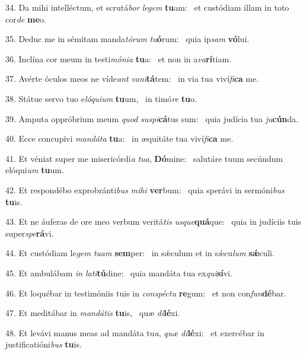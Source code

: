 34. Da mihi intelléctum, et scrutá\textit{bor} \textit{le}\textit{gem} \textbf{tu}am: \ast\  et custódiam illam in toto cor\textit{de} \textbf{me}o.\

35. Deduc me in sémitam manda\textit{tó}\textit{rum} \textit{tu}\textbf{ó}rum: \ast\  quia ip\textit{sam} \textbf{vó}lui.\

36. Inclína cor meum in testi\textit{mó}\textit{ni}\textit{a} \textbf{tu}a: \ast\  et non in a\textit{va}\textbf{rí}tiam.\

37. Avérte óculos meos ne víde\textit{ant} \textit{va}\textit{ni}\textbf{tá}tem: \ast\  in via tua viví\textit{fi}\textbf{ca} me.\

38. Státue servo tuo e\textit{ló}\textit{qui}\textit{um} \textbf{tu}um, \ast\  in timó\textit{re} \textbf{tu}o.\

39. Amputa oppróbrium meum \textit{quod} \textit{su}\textit{spi}\textbf{cá}tus sum: \ast\  quia judícia tua \textit{ju}\textbf{cún}da.\

40. Ecce concupívi \textit{man}\textit{dá}\textit{ta} \textbf{tu}a: \ast\  in æquitáte tua viví\textit{fi}\textbf{ca} me.\

41. Et véniat super me misericórdi\textit{a} \textit{tu}\textit{a}, \textbf{Dó}mine: \ast\  salutáre tuum secúndum elóqui\textit{um} \textbf{tu}um.\

42. Et respondébo exprobránti\textit{bus} \textit{mi}\textit{hi} \textbf{ver}bum: \ast\  quia sperávi in sermóni\textit{bus} \textbf{tu}is.\

43. Et ne áuferas de ore meo verbum veritá\textit{tis} \textit{us}\textit{que}\textbf{quá}que: \ast\  quia in judíciis tuis super\textit{spe}\textbf{rá}vi.\

44. Et custódiam le\textit{gem} \textit{tu}\textit{am} \textbf{sem}per: \ast\  in sǽculum et in sǽcu\textit{lum} \textbf{sǽ}culi.\

45. Et ambulábam \textit{in} \textit{la}\textit{ti}\textbf{tú}dine: \ast\  quia mandáta tua ex\textit{qui}\textbf{sí}vi.\

46. Et loquébar in testimóniis tuis in \textit{con}\textit{spéc}\textit{tu} \textbf{re}gum: \ast\  et non con\textit{fun}\textbf{dé}bar.\

47. Et meditábar in \textit{man}\textit{dá}\textit{tis} \textbf{tu}is, \ast\  quæ \textit{di}\textbf{lé}xi.\

48. Et levávi manus meas ad mandáta tu\textit{a}, \textit{quæ} \textit{di}\textbf{lé}xi: \ast\  et exercébar in justificatióni\textit{bus} \textbf{tu}is.\

